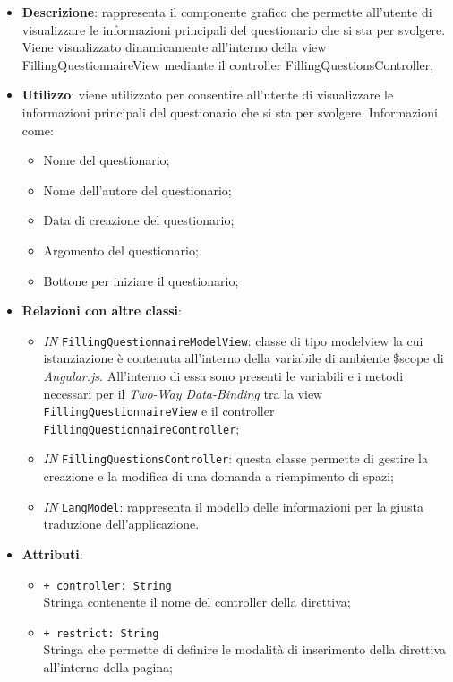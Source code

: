 		\begin{itemize}
			\item \textbf{Descrizione}: rappresenta il componente grafico che permette all'utente di visualizzare le informazioni principali del questionario che si sta per svolgere. Viene visualizzato dinamicamente all'interno della view FillingQuestionnaireView mediante il controller FillingQuestionsController;
			\item \textbf{Utilizzo}: viene utilizzato per consentire all'utente di visualizzare le informazioni principali del questionario che si sta per svolgere. Informazioni come:
			\begin{itemize}
				\item Nome del questionario;
				\item Nome dell'autore del questionario;
				\item Data di creazione del questionario;
				\item Argomento del questionario;
				\item Bottone per iniziare il questionario;
			\end{itemize}
			\item \textbf{Relazioni con altre classi}: 
			\begin{itemize}
				\item \textit{IN} \texttt{FillingQuestionnaireModelView}: classe di tipo modelview la cui istanziazione è contenuta all'interno della variabile di ambiente \$scope di \textit{Angular.js}. All'interno di essa sono presenti le variabili e i metodi necessari per il \textit{Two-Way Data-Binding} tra la view \texttt{FillingQuestionnaireView} e il controller \texttt{FillingQuestionnaireController};
				\item \textit{IN} \texttt{FillingQuestionsController}: questa classe permette di gestire la creazione e la modifica di una domanda a riempimento di spazi;
				\item \textit{IN} \texttt{LangModel}: rappresenta il modello delle informazioni per la giusta traduzione dell'applicazione.
			\end{itemize}
			\item \textbf{Attributi}: 
			\begin{itemize}
				\item \texttt{+ controller: String} \\ Stringa contenente il nome del controller della direttiva;
				\item \texttt{+ restrict: String} \\ Stringa che permette di definire le modalità di inserimento della direttiva all'interno della pagina;

\end{itemize}
\end{itemize}
